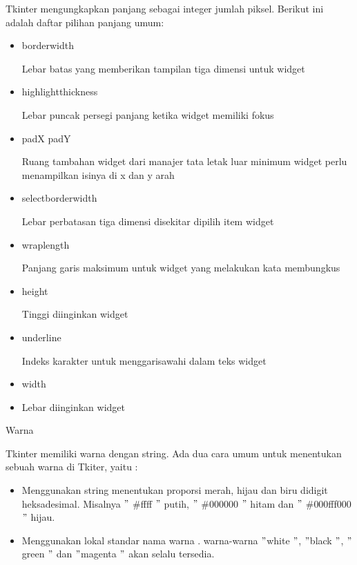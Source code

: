 \documentclass [12pt,a4paper,notitlepage,oneside,bahasa]{article}
\begin{document}
 \hspace*{0.5in} \vspace{12pt}
 \hspace*{0.5in} Tkinter mengungkapkan panjang sebagai integer jumlah piksel. Berikut ini adalah daftar pilihan panjang umum: \par
\noindent 
\begin{itemize}
\item borderwidth \par
Lebar batas yang memberikan tampilan tiga dimensi untuk widget \par
\noindent 
\item highlightthickness \par
Lebar puncak persegi panjang ketika widget memiliki fokus \par
\noindent 
\item padX padY \par
Ruang tambahan widget dari manajer tata letak luar minimum widget perlu menampilkan isinya di x dan y arah \par
\noindent 
\item selectborderwidth \par
Lebar perbatasan tiga dimensi disekitar dipilih item widget \par
\noindent 
\item wraplength \par
Panjang garis maksimum untuk widget yang melakukan kata membungkus \par
\noindent 
\item height \par
Tinggi diinginkan widget \par
\noindent 
\item underline \par
Indeks karakter untuk menggarisawahi dalam teks widget  \par
\noindent 
\item width \par
\noindent 
\item Lebar diinginkan widget\end{itemize}
 \par
\noindent 
Warna \par
\noindent 
Tkinter memiliki warna dengan string. Ada dua cara umum untuk menentukan sebuah warna di Tkiter, yaitu : \par
\noindent 
\begin{itemize}
\item Menggunakan string menentukan proporsi merah, hijau dan biru didigit heksadesimal. Misalnya  $ " $ $  \#  $ffff $ " $ putih,  $ " $ $  \#  $000000 $ " $ hitam dan  $ " $ $  \#  $000fff000 $ " $ hijau. \par
\noindent 
\item Menggunakan lokal standar nama warna . warna-warna  $ " $white $ " $, $ " $black $ " $,  $ " $green $ " $ dan  $ " $magenta $ " $ akan selalu tersedia.\end{itemize}
\end{document}
